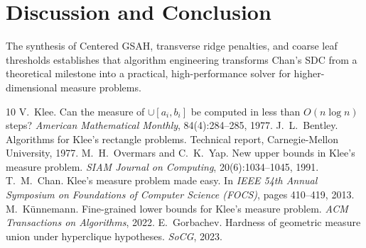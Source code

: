 \documentclass[11pt,a4paper]{article}
\theoremstyle{plain}
\theoremstyle{definition}
\begin{document}
\section{Discussion and Conclusion}
The synthesis of Centered GSAH, transverse ridge penalties, and coarse leaf thresholds establishes that algorithm engineering transforms Chan's SDC from a theoretical milestone into a practical, high-performance solver for higher-dimensional measure problems.


\begin{thebibliography}{10}
 V.~Klee. Can the measure of $\cup [a_i, b_i]$ be computed in less than $O(n \log n)$ steps? \emph{American Mathematical Monthly}, 84(4):284--285, 1977.
 J.~L.~Bentley. Algorithms for Klee's rectangle problems. Technical report, Carnegie-Mellon University, 1977.
 M.~H.~Overmars and C.~K.~Yap. New upper bounds in Klee's measure problem. \emph{SIAM Journal on Computing}, 20(6):1034--1045, 1991.
 T.~M.~Chan. Klee's measure problem made easy. In \emph{IEEE 54th Annual Symposium on Foundations of Computer Science (FOCS)}, pages 410--419, 2013.
 M.~K\"unnemann. Fine-grained lower bounds for Klee's measure problem. \emph{ACM Transactions on Algorithms}, 2022.
 E.~Gorbachev. Hardness of geometric measure union under hyperclique hypotheses. \emph{SoCG}, 2023.
\end{thebibliography}
\end{document}
